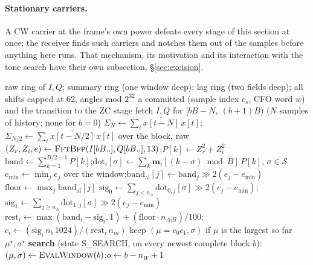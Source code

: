 \paragraph{Stationary carriers.}
A CW carrier at the frame's own power defeats every stage of this
section at once; the receiver finds such carriers and notches them
out of the samples before anything here runs.  That mechanism, its
motivation and its interaction with the tone search have their own
subsection, \S\ref{sec:excision}.

\begin{algorithm}[H]
\caption{C streaming tone detector (\texttt{rx\_stream.c}).}
\label{alg:tone_stream}
\begin{algorithmic}[1]
\Require raw ring of $I, Q$; summary ring (one window deep); lag ring (two fields deep); all shifts capped at 62, angles mod $2^{32}$
\Ensure a committed (sample index $c_s$, CFO word $w$) and the transition to the ZC stage
 
    \State fetch $I, Q$ for $[bB - N,\ (b{+}1)B)$ ($N$ samples of history; none for $b = 0$)
    \State $\Sigma_N \gets \sum_{t} \overline{x[t{-}N]}\, x[t]$;\quad $\Sigma_{N/2} \gets \sum_{t} \overline{x[t{-}N/2]}\, x[t]$ over the block, raw
    \State $(Z_r, Z_i, e) \gets \textsc{FftBfp}(I[bB..], Q[bB..], 13)$;\quad $P[k] \gets Z_r^2 + Z_i^2$
    \State $\mathrm{band} \gets \sum_{k=1}^{B/2-1} P[k]$;\quad $\mathrm{dot}_i[\sigma] \gets \sum_k \mathbf{m}_i[(k - \sigma) \bmod B]\, P[k]$, $\sigma \in \mathcal{S}$
\EndFunction
\Statex
{} 
    \State $e_{\min} \gets \min_j e_j$ over the window;\quad $\mathrm{band}_{\mathrm{al}}[j] \gets \mathrm{band}_j \gg 2(e_j - e_{\min})$
    \State $\mathrm{floor} \gets \max_j \mathrm{band}_{\mathrm{al}}[j]$ 
        \State $\mathrm{sig}_0 \gets \sum_{j < n_A} \mathrm{dot}_{0,j}[\sigma] \gg 2(e_j - e_{\min})$;\quad $\mathrm{sig}_1 \gets \sum_{j \ge n_A} \mathrm{dot}_{1,j}[\sigma] \gg 2(e_j - e_{\min})$
        \State $\mathrm{rest}_i \gets \max(\mathrm{band}_i - \mathrm{sig}_i, 1) + (\mathrm{floor} \cdot n_{A|B}) / 100$;\quad $c_i \gets (\mathrm{sig}_i\, n_b\, 1024) / (\mathrm{rest}_i\, n_m)$
        \State keep $(\mu = c_0 c_1, \sigma)$ if $\mu$ is the largest so far
    \EndFor
    \State \Return $\mu^\star, \sigma^\star$
\EndFunction
\Statex
\State \textbf{search} (state S\_SEARCH, on every newest complete block $b$):
\State $(\mu, \sigma) \gets \textsc{EvalWindow}(b)$;\quad $o \gets b - n_W + 1$

\end{algorithmic}
\end{algorithm}
